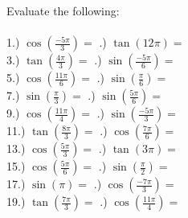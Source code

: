 \documentclass[12pt]{article}
\begin{document}
Evaluate the following:
\\\\

1.) $\cos(\frac{-5\pi}{3}) = $ \underline{\hspace{2cm}} \indent\indent\indent{}.) $\tan(12\pi) = $ \underline{\hspace{2cm}} \\

3.) $\tan(\frac{4\pi}{3}) = $ \underline{\hspace{2cm}} \indent\indent\indent{}.) $\sin(\frac{-5\pi}{6}) = $ \underline{\hspace{2cm}} \\

5.) $\cos(\frac{11\pi}{6}) = $ \underline{\hspace{2cm}} \indent\indent\indent{}.) $\sin(\frac{\pi}{6}) = $ \underline{\hspace{2cm}} \\

7.) $\sin(\frac{\pi}{3}) = $ \underline{\hspace{2cm}} \indent\indent\indent{}.) $\sin(\frac{5\pi}{6}) = $ \underline{\hspace{2cm}} \\

9.) $\cos(\frac{11\pi}{4}) = $ \underline{\hspace{2cm}} \indent\indent\indent{}.) $\sin(\frac{-5\pi}{3}) = $ \underline{\hspace{2cm}} \\

11.) $\tan(\frac{8\pi}{3}) = $ \underline{\hspace{2cm}} \indent\indent\indent{}.) $\cos(\frac{7\pi}{6}) = $ \underline{\hspace{2cm}} \\

13.) $\cos(\frac{5\pi}{3}) = $ \underline{\hspace{2cm}} \indent\indent\indent{}.) $\tan(3\pi) = $ \underline{\hspace{2cm}} \\

15.) $\cos(\frac{5\pi}{6}) = $ \underline{\hspace{2cm}} \indent\indent\indent{}.) $\sin(\frac{\pi}{2}) = $ \underline{\hspace{2cm}} \\

17.) $\sin(\pi) = $ \underline{\hspace{2cm}} \indent\indent\indent{}.) $\cos(\frac{-7\pi}{3}) = $ \underline{\hspace{2cm}} \\

19.) $\tan(\frac{7\pi}{3}) = $ \underline{\hspace{2cm}} \indent\indent\indent{}.) $\cos(\frac{11\pi}{4}) = $ \underline{\hspace{2cm}} \\
\end{document}
